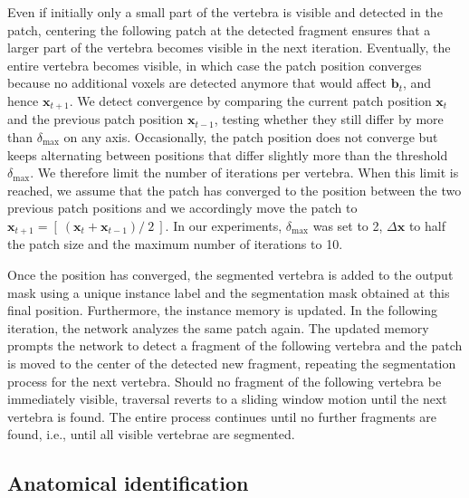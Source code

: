 \documentclass[authoryear,5p,final,times]{elsarticle}
\renewcommand{\vec}[1]{\bm{#1}}
\begin{document}
    Even if initially only a small part of the vertebra is visible and detected in the patch, centering the following patch at the detected fragment ensures that a larger part of the vertebra becomes visible in the next iteration. Eventually, the entire vertebra becomes visible, in which case the patch position converges because no additional voxels are detected anymore that would affect $\vec{b}_t$, and hence $\vec{x}_{t+1}$. We detect convergence by comparing the current patch position $\vec{x}_t$ and the previous patch position $\vec{x}_{t-1}$, testing whether they still differ by more than $\delta_\text{max}$ on any axis. Occasionally, the patch position does not converge but keeps alternating between positions that differ slightly more than the threshold $\delta_\text{max}$. We therefore limit the number of iterations per vertebra. When this limit is reached, we assume that the patch has converged to the position between the two previous patch positions and we accordingly move the patch to $
        \vec{x}_{t+1} =
        \left[ \ \left(
          \vec{x}_{t} + \vec{x}_{t-1}
        \right) /\ 2 \ \right]
    $. In our experiments, $\delta_\text{max}$ was set to \num{2}, $\Delta \vec{x}$ to half the patch size and the maximum number of iterations to \num{10}.

    Once the position has converged, the segmented vertebra is added to the output mask using a unique instance label and the segmentation mask obtained at this final position. Furthermore, the instance memory is updated. In the following iteration, the network analyzes the same patch again. The updated memory prompts the network to detect a fragment of the following vertebra and the patch is moved to the center of the detected new fragment, repeating the segmentation process for the next vertebra. Should no fragment of the following vertebra be immediately visible, traversal reverts to a sliding window motion until the next vertebra is found. The entire process continues until no further fragments are found, i.e., until all visible vertebrae are segmented.

    \subsection{Anatomical identification}
    \label{sec:method_identification}
\end{document}
